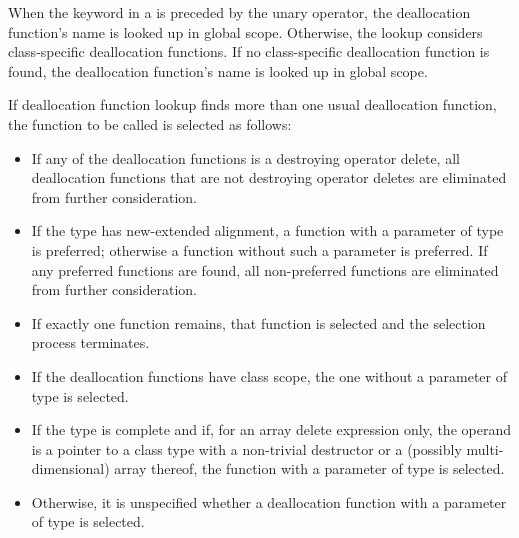 \pnum
When the keyword  in a  is
preceded by the unary \tcode{::} operator, the deallocation function's name is looked
up in global scope. Otherwise, the lookup considers class-specific deallocation
functions. If no class-specific deallocation function is found,
the deallocation function's name is looked up in global scope.

\pnum
If deallocation function lookup finds more than one usual
deallocation function,
the function to be called is selected as follows:
\begin{itemize}
\item
If any of the deallocation functions is a destroying operator delete,
all deallocation functions that are not destroying operator deletes
are eliminated from further consideration.
\item
If the type has new-extended alignment,
a function with a parameter of type  is preferred;
otherwise a function without such a parameter is preferred.
If any preferred functions are found,
all non-preferred functions are eliminated from further consideration.
\item
If exactly one function remains,
that function is selected and the selection process terminates.
\item
If the deallocation functions have class scope,
the one without a parameter of type  is selected.
\item
If the type is complete
and if, for an array delete expression only,
the operand is a pointer to a class type with a
non-trivial destructor or a (possibly multi-dimensional) array thereof,
the function with a parameter of type  is selected.
\item
Otherwise, it is unspecified
whether a deallocation function with a parameter of type 
is selected.
\end{itemize}

